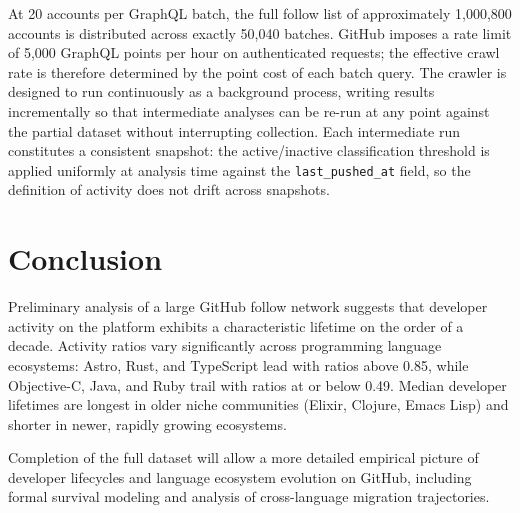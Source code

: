 \documentclass[12pt,a4paper]{article}
\begin{document}
At 20 accounts per GraphQL batch, the full follow list of approximately
1,000,800 accounts is distributed across exactly 50,040 batches. GitHub imposes
a rate limit of 5,000 GraphQL points per hour on authenticated requests; the
effective crawl rate is therefore determined by the point cost of each batch
query. The crawler is designed to run continuously as a background process,
writing results incrementally so that intermediate analyses can be re-run at any
point against the partial dataset without interrupting collection. Each
intermediate run constitutes a consistent snapshot: the active/inactive
classification threshold is applied uniformly at analysis time against the
\texttt{last\_pushed\_at} field, so the definition of activity does not drift
across snapshots.

\section{Conclusion}

Preliminary analysis of a large GitHub follow network suggests that developer
activity on the platform exhibits a characteristic lifetime on the order of a
decade. Activity ratios vary significantly across programming language
ecosystems: Astro, Rust, and TypeScript lead with ratios above 0.85, while
Objective-C, Java, and Ruby trail with ratios at or below 0.49. Median developer
lifetimes are longest in older niche communities (Elixir, Clojure, Emacs Lisp)
and shorter in newer, rapidly growing ecosystems.

Completion of the full dataset will allow a more detailed empirical picture of
developer lifecycles and language ecosystem evolution on GitHub, including formal
survival modeling and analysis of cross-language migration trajectories.
\end{document}
